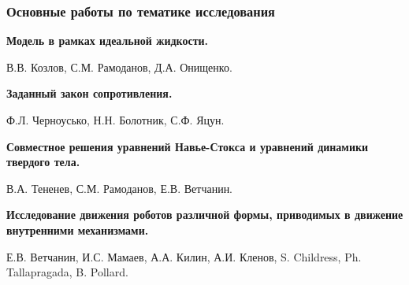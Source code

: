 \begin{frame}
\frametitle{Основные работы по тематике исследования}

\textbf{Модель в рамках идеальной жидкости.} %

В.В. Козлов, С.М. Рамоданов, Д.А. Онищенко.

\textbf{Заданный закон сопротивления.} 

Ф.Л. Черноусько, Н.Н. Болотник, С.Ф. Яцун.

\textbf{Совместное решения уравнений Навье-Стокса и уравнений динамики твердого тела.} 

В.А. Тененев, С.М. Рамоданов, Е.В. Ветчанин.


\textbf{Исследование движения роботов различной формы, приводимых в движение внутренними механизмами.} 

Е.В. Ветчанин, И.С. Мамаев, А.А. Килин, А.И. Кленов, S. Childress, Ph. Tallapragada, B. Pollard.


\begin{minipage}[t]{0.47\linewidth}
	\vspace{-3mm}
	 \\
\end{minipage}
\hfill	
\begin{minipage}[t]{0.47\linewidth}
	\vspace{3mm}
\end{minipage}





\end{frame}

